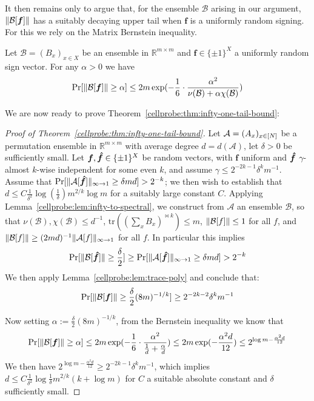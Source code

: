 It then remains only to argue that, for the ensemble $\mathcal{B}$ arising in our argument, $\Vert \mathcal{B}[\bm{f}] \Vert$ has a suitably decaying upper tail when $\bm{f}$ is a uniformly random signing. For this we rely on the Matrix Bernstein inequality. 
\begin{theorem}
Let $\mathcal{B}=(B_x)_{x \in X}$ be an ensemble in $\mathbb{R}^{m \times m}$ and $\bm{f} \in \{\pm 1\}^X$ a uniformly random sign vector. For any $\alpha > 0$ we have
\[
\Pr[\Vert \mathcal{B}[\bm{f}] \Vert \geq \alpha ] \leq 2m \exp (-\frac{1}{6} \cdot \frac{\alpha ^2}{\nu(\mathcal{B}) + \alpha \chi(\mathcal{B}) })
\]
\end{theorem}

We are now ready to prove Theorem~\ref{cellprobe:thm:infty-one-tail-bound}:
\begin{proof}[Proof of Theorem~\ref{cellprobe:thm:infty-one-tail-bound}]
Let $\mathcal{A} = (A_x)_{x \in [N]}$ be a permutation ensemble in $\mathbb{R}^{m \times m}$ with average degree $d=d(\mathcal{A})$, let $\delta > 0$ be sufficiently small. Let $\bm{f}, \bm{\hat{f}} \in \{\pm 1\}^X$ be random vectors, with $\bm{f}$ uniform and $\bm{\hat{f}}$ $\gamma$-almost $k$-wise independent for some even $k$, and assume $\gamma \leq 2^{-2k - 1} \delta^k m^{-1}$. Assume that $\Pr[\Vert \mathcal{A}[\bm{\hat{f}}] \Vert_{\infty\to 1} \geq \delta md ]> 2^{-k}$; we then wish to establish that $d \leq   C\frac{1}{\delta^2} \log(\frac{1}{\delta}) m^{2/k}\log m $ for a suitably large constant $C$.
Applying Lemma~\ref{cellprobe:lem:infty-to-spectral}, we construct from $\mathcal{A}$ an ensemble $\mathcal{B}$, so that $\nu(\mathcal{B}),\chi(\mathcal{B}) \leq d^{-1}$, $\mathrm{tr}((\sum_x B_x)^{\bowtie k})\leq m$, $\Vert \mathcal{B}[f] \Vert \leq 1$ for all $f$, and $\Vert \mathcal{B}[f] \Vert \geq (2md)^{-1} \Vert \mathcal{A}[f] \Vert_{\infty\to 1}$ for all $f$. In particular this implies
\[
\Pr[\Vert \mathcal{B}[\bm{\hat{f}}] \Vert \geq \frac{\delta}{2} ] \geq  \Pr[ \Vert \mathcal{A}[\bm{\hat{f}}] \Vert_{\infty\to 1} \geq \delta md]   > 2^{-k}
\]
We then apply Lemma~\ref{cellprobe:lem:trace-poly} and conclude that:
\[
\Pr[\Vert \mathcal{B}[\bm{f}] \Vert \geq \frac{\delta}{2} (8m)^{-1/k}] \geq 2^{-2k-2} \delta^k m^{-1} 
\]

Now setting $\alpha:= \frac{\delta}{2} (8m)^{-1/k}$, from the Bernstein inequality we know that
\[
 \Pr[\Vert \mathcal{B}[\bm{f}] \Vert \geq \alpha ] \leq 2m \exp(-\frac{1}{6} \cdot \frac{\alpha^2}{\frac{1}{d} + \frac{\alpha}{d}}) \leq 2m \exp (-\frac{\alpha^2 d}{12}) \leq 2^{\log m - \frac{\alpha^2d}{12}}
\]
We then have $2^{\log m - \frac{\alpha^2 d}{12}} \geq 2^{-2k-1} \delta^k m^{-1} $,
which implies $d \leq C\frac{1}{\delta^2} \log \frac{1}{\delta} m^{2/k} (k + \log m)$ for $C$ a suitable absolute constant and $\delta$ sufficiently small.
\end{proof}


